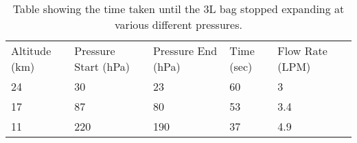 \begin{table}[H]
\centering

\begin{tabular}{|l|l|l|l|l|l}
\cline{1-5}
Altitude (km) & Pressure Start (hPa) & Pressure End (hPa) & Time (sec) & Flow Rate (LPM) &  \\ \cline{1-5}
24 & 30 & 23 & 60 & 3 &  \\ \cline{1-5}
17 & 87 & 80 & 53 & 3.4 &  \\ \cline{1-5}
11 & 220 & 190 & 37 & 4.9 &  \\ \cline{1-5}
\end{tabular}
\caption{Table showing the time taken until the 3L bag stopped expanding at various different pressures.}
\label{tab:pump-low-pressure-result}
\end{table}

\raggedbottom